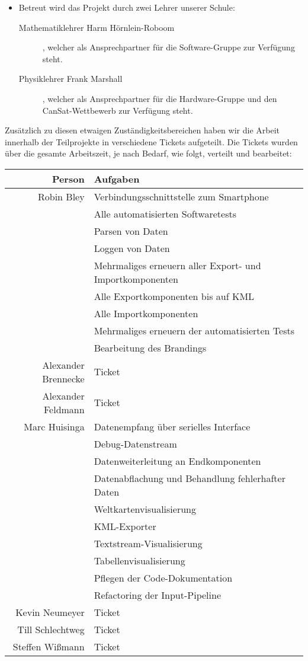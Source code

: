 \begin{itemize}
\item Betreut wird das Projekt durch zwei Lehrer unserer Schule:
\begin{description}
\item [Mathematiklehrer Harm Hörnlein-Roboom], welcher als Ansprechpartner für die Software-Gruppe zur Verfügung steht.
\item [Physiklehrer Frank Marshall], welcher als Ansprechpartner für die Hardware-Gruppe und den CanSat-Wettbewerb zur Verfügung steht.
\end{description}

\end{itemize}

Zusätzlich zu diesen etwaigen Zuständigkeitsbereichen haben wir die Arbeit innerhalb der Teilprojekte in verschiedene Tickets aufgeteilt. Die Tickets wurden über die gesamte Arbeitszeit, je nach Bedarf, wie folgt, verteilt und bearbeitet:

\begin{table}[H]
	\centering
	\begin{tabular}{rl}
		\toprule
		\textbf{Person} & \textbf{Aufgaben} \\
		\midrule
		Robin Bley & Verbindungsschnittstelle zum Smartphone \\
		 & Alle automatisierten Softwaretests \\
		 & Parsen von Daten\\
		 & Loggen von Daten \\
		 & Mehrmaliges erneuern aller Export- und Importkomponenten\\
		 & Alle Exportkomponenten bis auf KML \\
		 & Alle Importkomponenten\\
		 & Mehrmaliges erneuern der automatisierten Tests\\
		 & Bearbeitung des Brandings\\
		Alexander Brennecke & Ticket \\
		Alexander Feldmann & Ticket \\
		Marc Huisinga & Datenempfang über serielles Interface \\
		 & Debug-Datenstream \\
		 & Datenweiterleitung an Endkomponenten \\
		 & Datenabflachung und Behandlung fehlerhafter Daten \\
		 & Weltkartenvisualisierung \\
		 & KML-Exporter \\
		 & Textstream-Visualisierung \\
		 & Tabellenvisualisierung \\
		 & Pflegen der Code-Dokumentation \\
		 & Refactoring der Input-Pipeline \\
		Kevin Neumeyer & Ticket \\
		Till Schlechtweg & Ticket \\
		Steffen Wißmann & Ticket \\
		\bottomrule
	\end{tabular}
\end{table}

